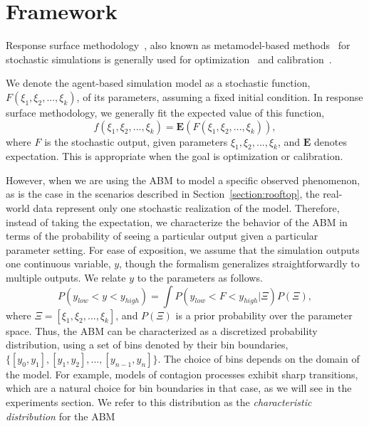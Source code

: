 \section{Framework}

Response surface methodology~\cite{box51response,carley04response}, also known as metamodel-based methods~\cite{barton06metamodel} for stochastic simulations is generally used for optimization~\cite{neddermeijer00response} and calibration~\cite{fadikar17emulation, lamperti18calibration}.


We denote the agent-based simulation model as a stochastic function, $F(\xi_1, \xi_2, ..., \xi_k)$, of its parameters, assuming a fixed initial condition. In response surface methodology, we generally fit the expected value of this function,
\begin{equation}
f(\xi_1, \xi_2, ..., \xi_k) = \mathbf{E}(F(\xi_1, \xi_2, ..., \xi_k)),
\end{equation}
where $F$ is the stochastic output, given parameters $\xi_1, \xi_2, ..., \xi_k$, and $\mathbf{E}$ denotes expectation. This is appropriate when the goal is optimization or calibration.

However, when we are using the ABM to model a specific observed phenomenon, as is the case in the scenarios described in Section~\ref{section:rooftop}, the real-world data represent only one stochastic realization of the model.
Therefore, instead of taking the expectation, we characterize the behavior of the ABM in terms of the probability of seeing a particular output given a particular
parameter setting. For ease of exposition, we assume that the simulation outputs one continuous variable, $y$, though the
formalism generalizes straightforwardly to multiple outputs. We relate $y$ to the parameters as follows.
\begin{equation}
P(y_{low} < y < y_{high}) = \int P(y_{low} < F < y_{high}|\Xi)P(\Xi),
\label{output_probability}
\end{equation}
where $\Xi = [\xi_1, \xi_2, ..., \xi_k]$, and $P(\Xi)$ is a prior probability over the parameter space. Thus, the ABM can be
characterized as a discretized probability distribution, using a set of bins denoted by their bin boundaries, $\{[y_0,y_1], [y_1,y_2], ..., [y_{n-1}, y_n]\}$.
The choice of bins depends on the domain of the model. For example, models of contagion processes exhibit sharp
transitions, which are a natural choice for bin boundaries in that case, as we will see in the experiments section. We
refer to this distribution as the \emph{characteristic distribution} for the ABM

